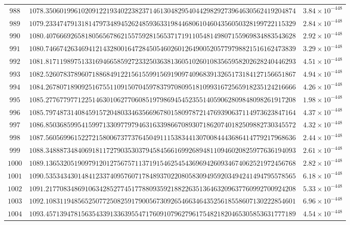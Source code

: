\documentclass[12pt,reqno]{amsart}
\theoremstyle{remark}
\begin{document}
\begin{longtable}{clc}
$988$ & $1078.3506019961020912219340223823714613048295404429829273964630562419204874$ & $3.84\times 10^{-448}$ \\
$989$ & $1079.2334747913181479734894526248593633198446806104604356050328199722115329$ & $2.84\times 10^{-448}$ \\
$990$ & $1080.4076669265818056567862155759281565371719110548149807155969834883543628$ & $2.92\times 10^{-448}$ \\
$991$ & $1080.7466742634694121432800164728450546026012649005205779798821516162473839$ & $3.29\times 10^{-448}$ \\
$992$ & $1081.8171198975133169466585927233250363813605102601083565958202628240446293$ & $4.51\times 10^{-448}$ \\
$993$ & $1082.5260783789607188684912215615599156919097409683913265173184127156651867$ & $4.94\times 10^{-448}$ \\
$994$ & $1084.2678071890925167551109150704597837970809518109931672565918235124216666$ & $4.26\times 10^{-448}$ \\
$995$ & $1085.2776779771225146301062770608519798694545235514059062809848098261917208$ & $1.98\times 10^{-448}$ \\
$996$ & $1085.7974873140845915720480334635669678015809787214769390637114973623847164$ & $4.37\times 10^{-448}$ \\
$997$ & $1086.8503685995415997133097797946316339866708930718620740182509882730345572$ & $4.32\times 10^{-448}$ \\
$998$ & $1087.5605699615227215800673773764504911153834413070084443686414779217968636$ & $2.44\times 10^{-448}$ \\
$999$ & $1088.3488873484069181172790353037945845661699268948110946020825977636194093$ & $2.61\times 10^{-448}$ \\
$1000$ & $1089.1365320519097912012756757113719154625454369694260934674062521972456768$ & $2.82\times 10^{-448}$ \\
$1001$ & $1090.5353434301484123374095760717848937022080583094959203494241494795578565$ & $6.18\times 10^{-448}$ \\
$1002$ & $1091.2177083486910634285277451778809359218822635136463209637760992700924208$ & $5.33\times 10^{-448}$ \\
$1003$ & $1092.1083119485652507725082591790056730926546634643525618558607130222854601$ & $6.96\times 10^{-448}$ \\
$1004$ & $1093.4571394781563543391336395547176091079627961754821820465305853631777189$ & $4.54\times 10^{-448}$ \\
\end{longtable}
\normalsize
\setlength{\LTleft}{0pt}
\setlength{\LTright}{0pt}
\end{document}
